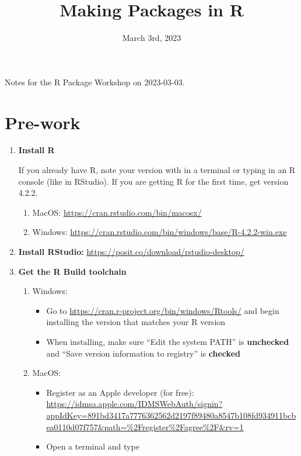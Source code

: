 \documentclass{article}
\title{Making Packages in R}
\date{March 3rd, 2023}
\begin{document}
\maketitle

Notes for the R Package Workshop on 2023-03-03.

\section{Pre-work}

\begin{enumerate}
    \item \textbf{Install R}

        If you already have R, note your version with  in a terminal or typing  in an R console (like in RStudio).
        If you are getting R for the first time, get version 4.2.2.

        \begin{enumerate}
            \item MacOS: \url{https://cran.rstudio.com/bin/macosx/}
            \item Windows: \url{https://cran.rstudio.com/bin/windows/base/R-4.2.2-win.exe}
        \end{enumerate}

    \item \textbf{Install RStudio:} \url{https://posit.co/download/rstudio-desktop/}

    \item \textbf{Get the R Build toolchain}
        \begin{enumerate}
            \item Windows:

                \begin{itemize}
                    \item Go to \url{https://cran.r-project.org/bin/windows/Rtools/} and begin installing the version that matches your R version
                    \item When installing, make sure ``Edit the system PATH'' is \textbf{unchecked} and ``Save version information to registry'' is \textbf{checked}
                \end{itemize}

            \item MacOS:
                \begin{itemize}
                    \item Register as an Apple developer (for free): \url{https://idmsa.apple.com/IDMSWebAuth/signin?appIdKey=891bd3417a7776362562d2197f89480a8547b108fd934911bcbea0110d07f757&path=%2Fregister%2Fagree%2F&rv=1}
                    \item Open a terminal and type 
                \end{itemize}
        \end{enumerate}
    

\end{enumerate}
\end{document}
